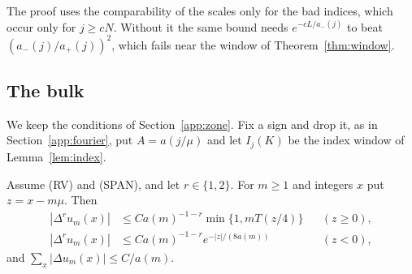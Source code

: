 The proof uses the comparability of the scales only for the bad indices, which occur only for
$j\ge cN$. Without it the same bound needs $e^{-cL/a_\minus(j)}$ to beat
$(a_\minus(j)/a_\plus(j))^2$, which fails near the window of Theorem~\ref{thm:window}.

\subsection{The bulk}\label{app:bulk}

We keep the conditions of Section~\ref{app:zone}. Fix a sign and drop it, as in
Section~\ref{app:fourier}, put $A=a(j/\mu)$ and let $I_j(K)$ be the index window of
Lemma~\ref{lem:index}.

\begin{lemma}\label{lem:pointwise}
Assume (RV) and (SPAN), and let $r\in\{1,2\}$. For $m\ge1$ and integers $x$ put $z=x-m\mu$. Then
\begin{align*}
 |\Delta^ru_m(x)|&\le Ca(m)^{-1-r}\min\{1,mT(z/4)\}&&(z\ge0),\\
 |\Delta^ru_m(x)|&\le Ca(m)^{-1-r}e^{-|z|/(8a(m))}&&(z<0),
\end{align*}
and $\sum_x|\Delta u_m(x)|\le C/a(m)$.
\end{lemma}

